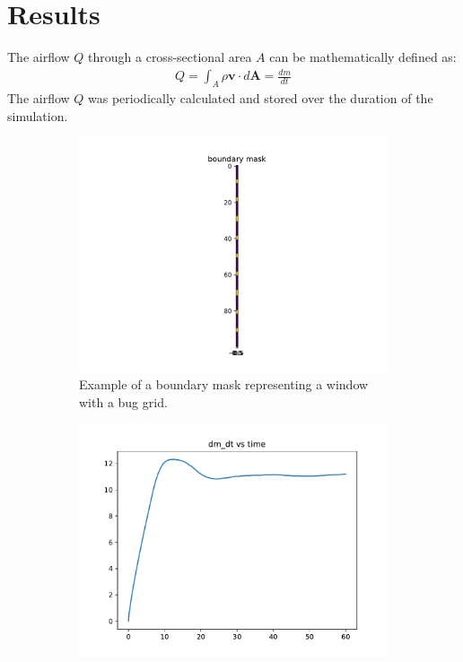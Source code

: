 \section{Results} \label{section: results}
The airflow $Q$ through a cross-sectional area $A$ can be mathematically defined as:
\begin{gather}
    Q = \int_A \rho \mathbf{v} \cdot d\mathbf{A} = \frac{dm}{dt} \label{eq: flow_rate}
\end{gather}
The airflow $Q$ was periodically calculated and stored over the duration of the simulation.

\begin{figure}[H]
    \centering
    \begin{subfigure}[b]{0.47\textwidth}
        \centering
        \includegraphics[width=\textwidth]{figures/bound_ex3.pdf}
        \caption{Example of a boundary mask representing a window with a bug grid.}
        \label{fig: bound1}
    \end{subfigure}
    \hfill
    \begin{subfigure}[b]{0.47\textwidth}
        \centering
        \includegraphics[width=\textwidth]{figures/dm_dt/log_holecount_10_holewidth_0.4_repeat_1.pdf}  %

\end{subfigure}
\end{figure}

